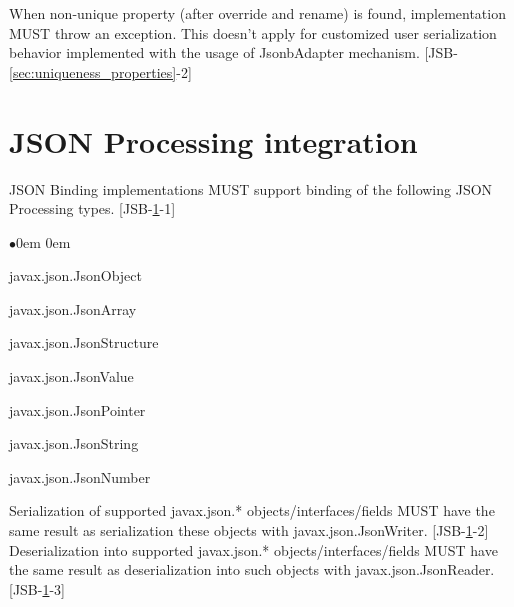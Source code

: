 When non-unique property (after override and rename) is found, implementation MUST throw an exception. This doesn't apply for customized user serialization behavior implemented with the usage of JsonbAdapter mechanism. [JSB-\ref{sec:uniqueness_properties}-2]

\section{JSON Processing integration}
\label{sec:jsonp_integration}
JSON Binding implementations MUST support binding of the following JSON Processing types. [JSB-\ref{sec:jsonp_integration}-1]

\begin{list}{$\bullet$}{\parsep 0em  0em}
\item javax.json.JsonObject
\item javax.json.JsonArray
\item javax.json.JsonStructure
\item javax.json.JsonValue
\item javax.json.JsonPointer
\item javax.json.JsonString
\item javax.json.JsonNumber
\end{list}

Serialization of supported javax.json.* objects/interfaces/fields MUST have the same result as serialization these objects with javax.json.JsonWriter. [JSB-\ref{sec:jsonp_integration}-2]
Deserialization into supported javax.json.* objects/interfaces/fields MUST have the same result as deserialization into such objects with javax.json.JsonReader. [JSB-\ref{sec:jsonp_integration}-3]